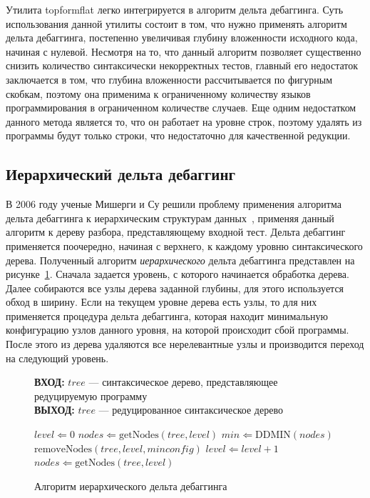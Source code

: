 Утилита topformflat легко интегрируется в алгоритм дельта дебаггинга. Суть использования данной утилиты состоит в том, что нужно применять алгоритм дельта дебаггинга, постепенно увеличивая глубину вложенности исходного кода, начиная с нулевой. Несмотря на то, что данный алгоритм позволяет существенно снизить количество синтаксически некорректных тестов, главный его недостаток заключается в том, что глубина вложенности рассчитывается по фигурным скобкам, поэтому она применима к ограниченному количеству языков программирования в ограниченном количестве случаев. Еще одним недостатком данного метода является то, что он работает на уровне строк, поэтому удалять из программы будут только строки, что недостаточно для качественной редукции.

\subsection{Иерархический дельта дебаггинг}\label{hddalg}
В 2006 году ученые Мишерги и Су решили проблему применения алгоритма дельта дебаггинга к иерархическим структурам данных~\cite{misherghi2006hdd}, применяя данный алгоритм к дереву разбора, представляющему входной тест. Дельта дебаггинг применяется поочередно, начиная с верхнего, к каждому уровню синтаксического дерева. Полученный алгоритм \emph{иерархического} дельта дебаггинга представлен на рисунке~\ref{alg:hdd}. Сначала задается уровень, с которого начинается обработка дерева. Далее собираются все узлы дерева заданной глубины, для этого используется обход в ширину. Если на текущем уровне дерева есть узлы, то для них применяется процедура дельта дебаггинга, которая находит минимальную конфигурацию узлов данного уровня, на которой происходит сбой программы. После этого из дерева удаляются все нерелевантные узлы и производится переход на следующий уровень.


\begin{figure}[h]
\textbf{ВХОД:} $tree$ --- синтаксическое дерево, представляющее редуцируемую программу \\
\textbf{ВЫХОД:} $tree$ --- редуцированное синтаксическое дерево \\
\begin{algorithmic}[1]
\STATE $level \Leftarrow 0$
\STATE $nodes \Leftarrow \text{getNodes}(tree, level)$
	\STATE $min \Leftarrow \text{DDMIN}(nodes)$
	\STATE $\text{removeNodes}(tree, level, minconfig)$
	\STATE $level \Leftarrow level + 1$
	\STATE $nodes \Leftarrow \text{getNodes}(tree, level)$
\ENDWHILE
\end{algorithmic}
\caption{Алгоритм иерархического дельта дебаггинга}
\label{alg:hdd}
\end{figure}

